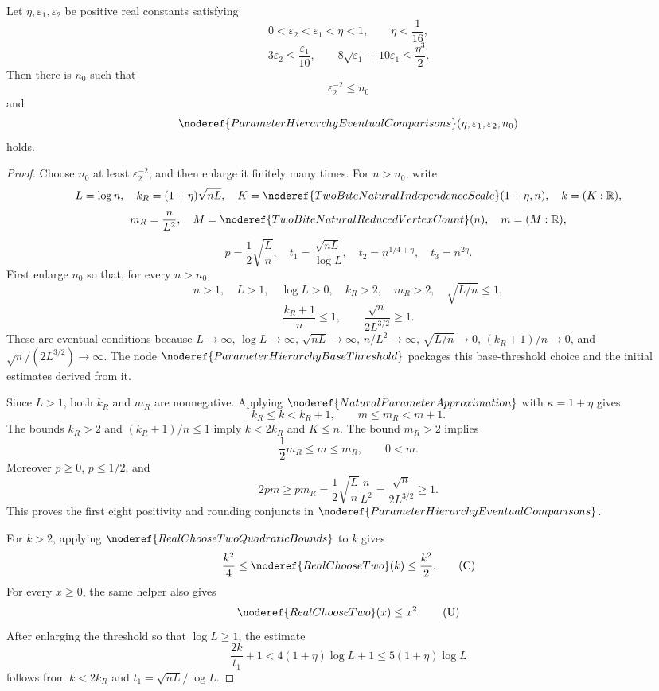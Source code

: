 \begin{lemma}
Let \(\eta,\varepsilon_1,\varepsilon_2\) be positive real constants satisfying
\[
0<\varepsilon_2<\varepsilon_1<\eta<1,\qquad \eta<\frac1{16},
\]
\[
3\varepsilon_2\le\frac{\varepsilon_1}{10},
\qquad
8\sqrt{\varepsilon_1}+10\varepsilon_1\le\frac{\eta^3}{2}.
\]
Then there is \(n_0\) such that
\[
\varepsilon_2^{-2}\le n_0
\]
and
\[
\noderef{ParameterHierarchyEventualComparisons}(\eta,\varepsilon_1,
\varepsilon_2,n_0)
\]
holds.
\end{lemma}
\begin{proof}
Choose \(n_0\) at least \(\varepsilon_2^{-2}\), and then enlarge it finitely
many times.  For \(n>n_0\), write
\[
L=\log n,\quad
k_R=(1+\eta)\sqrt{nL},\quad
K=\noderef{TwoBiteNaturalIndependenceScale}(1+\eta,n),\quad k=(K:\mathbb R),
\]
\[
m_R=\frac{n}{L^2},\quad
M=\noderef{TwoBiteNaturalReducedVertexCount}(n),\quad m=(M:\mathbb R),
\]
\[
p=\frac12\sqrt{\frac Ln},\quad
t_1=\frac{\sqrt{nL}}{\log L},\quad
t_2=n^{1/4+\eta},\quad t_3=n^{2\eta}.
\]
First enlarge \(n_0\) so that, for every \(n>n_0\),
\[
n>1,\quad L>1,\quad \log L>0,\quad k_R>2,\quad m_R>2,
\quad \sqrt{L/n}\le1,
\]
\[
\frac{k_R+1}{n}\le1,\qquad
\frac{\sqrt n}{2L^{3/2}}\ge1.
\]
These are eventual conditions because \(L\to\infty\), \(\log L\to\infty\),
\(\sqrt{nL}\to\infty\), \(n/L^2\to\infty\), \(\sqrt{L/n}\to0\),
\((k_R+1)/n\to0\), and \(\sqrt n/(2L^{3/2})\to\infty\).
The node \(\noderef{ParameterHierarchyBaseThreshold}\) packages this
base-threshold choice and the initial estimates derived from it.

Since \(L>1\), both \(k_R\) and \(m_R\) are nonnegative.  Applying
\(\noderef{NaturalParameterApproximation}\) with \(\kappa=1+\eta\) gives
\[
k_R\le k<k_R+1,\qquad m\le m_R<m+1.
\]
The bounds \(k_R>2\) and \((k_R+1)/n\le1\) imply \(k<2k_R\) and \(K\le n\).
The bound \(m_R>2\) implies
\[
\frac12m_R\le m\le m_R,\qquad 0<m.
\]
Moreover \(p\ge0\), \(p\le1/2\), and
\[
2pm\ge p m_R
=\frac12\sqrt{\frac Ln}\frac n{L^2}
=\frac{\sqrt n}{2L^{3/2}}\ge1.
\]
This proves the first eight positivity and rounding conjuncts in
\(\noderef{ParameterHierarchyEventualComparisons}\).

For \(k>2\), applying \(\noderef{RealChooseTwoQuadraticBounds}\) to \(k\)
gives
\[
\frac{k^2}{4}\le \noderef{RealChooseTwo}(k)\le\frac{k^2}{2}. \tag{C}
\]
For every \(x\ge0\), the same helper also gives
\[
\noderef{RealChooseTwo}(x)\le x^2. \tag{U}
\]
After enlarging the threshold so that \(\log L\ge1\), the estimate
\[
\frac{2k}{t_1}+1<4(1+\eta)\log L+1\le5(1+\eta)\log L \tag{D}
\]
follows from \(k<2k_R\) and \(t_1=\sqrt{nL}/\log L\).


\end{proof}
